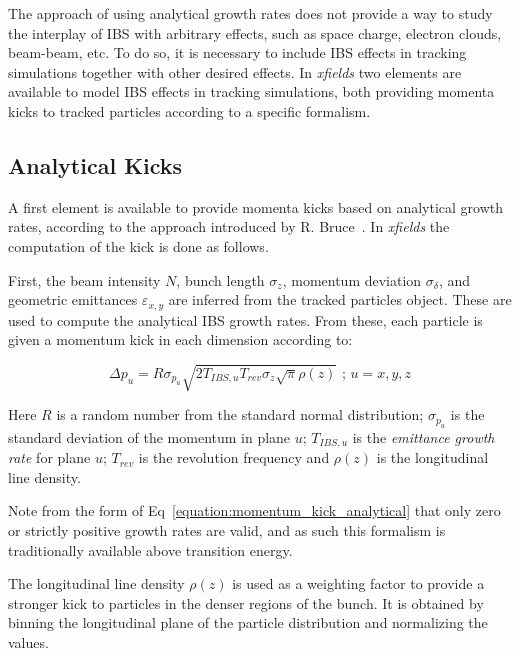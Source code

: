 The approach of using analytical growth rates does not provide a way to study the interplay of IBS with arbitrary effects, such as space charge, electron clouds, beam-beam, etc.
To do so, it is necessary to include IBS effects in tracking simulations together with other desired effects.
In \textit{xfields} two elements are available to model IBS effects in tracking simulations, both providing momenta kicks to tracked particles according to a specific formalism.

\subsection{Analytical Kicks}
\label{subsection:analytical_kicks}

A first element is available to provide momenta kicks based on analytical growth rates, according to the approach introduced by R. Bruce~\cite{PRAB:Bruce:IBSAnalyticalKick}.
In \textit{xfields} the computation of the kick is done as follows.
\newline

First, the beam intensity \(N\), bunch length \(\sigma_z\), momentum deviation \(\sigma_{\delta}\), and geometric emittances \(\varepsilon_{x,y}\) are inferred from the tracked particles object.
These are used to compute the analytical IBS growth rates.
From these, each particle is given a momentum kick in each dimension according to:

\begin{equation}
    \boxed{\Delta p_u = R \sigma_{p_u} \sqrt{ 2 T_{IBS,u} T_{rev} \sigma_z \sqrt{\pi} \rho(z)} \text{ ;   } u=x,y,z}
    \label{equation:momentum_kick_analytical}
\end{equation}

Here \(R\) is a random number from the standard normal distribution; \(\sigma_{p_u}\) is the standard deviation of the momentum in plane \(u\); \(T_{IBS,u}\) is the \textit{emittance growth rate} for plane \(u\); \(T_{rev}\) is the revolution frequency and \(\rho(z)\) is the longitudinal line density.
\newline

Note from the form of Eq~\eqref{equation:momentum_kick_analytical} that only zero or strictly positive growth rates are valid, and as such this formalism is traditionally available above transition energy.
\newline

The longitudinal line density \(\rho(z)\) is used as a weighting factor to provide a stronger kick to particles in the denser regions of the bunch.
It is obtained by binning the longitudinal plane of the particle distribution and normalizing the values.

